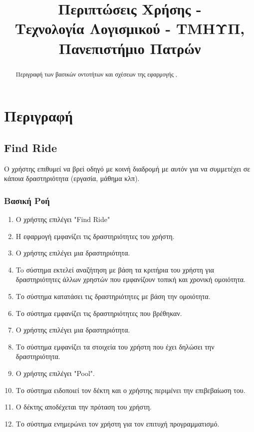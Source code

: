 

\fancyhead[R]{\leftmark}

\title{
    Περιπτώσεις Χρήσης - \appname\\[1ex]
    \large Τεχνολογία Λογισμικού - ΤΜΗΥΠ, Πανεπιστήμιο Πατρών \\[2ex]
}



\maketitle
\thispagestyle{empty}
\newpage

\tableofcontents
\newpage

\begin{abstract}
    Περιγραφή των βασικών οντοτήτων και σχέσεων της εφαρμογής \appname,
\end{abstract}

\newpage

\section{Περιγραφή}

\subsection{Find Ride}

Ο χρήστης επιθυμεί να βρεί οδηγό με κοινή διαδρομή με αυτόν για να συμμετέχει σε
κάποια δραστηριότητα (εργασία, μάθημα κλπ).

\subsubsection{Βασική Ροή}
\begin{enumerate}
    \item Ο χρήστης επιλέγει "Find Ride"
    \item Η εφαρμογή εμφανίζει τις δραστηριότητες του χρήστη.
    \item Ο χρήστης επιλέγει μια δραστηριότητα.
    \item To σύστημα εκτελεί αναζήτηση με βάση τα κριτήρια του χρήστη για δραστηριότητες
          άλλων χρηστών που εμφανίζουν τοπική και χρονική ομοιότητα.
    \item Το σύστημα κατατάσει τις δραστηριότητες με βάση την ομοιότητα.
    \item Το σύστημα εμφανίζει τις δραστηριότητες που βρέθηκαν.
    \item Ο χρήστης επιλέγει μια δραστηριότητα.
    \item Το σύστημα εμφανίζει τα στοιχεία του χρήστη που έχει δηλώσει την δραστηριότητα.
    \item Ο χρήστης επιλέγει "Pool".
    \item Το σύστημα ειδοποιεί τον δέκτη και ο χρήστης περιμένει την επιβεβαίωση του.
    \item O δέκτης αποδέχεται την πρόταση του χρήστη.
    \item Το σύστημα ενημερώνει τον χρήστη για τον επιτυχή προγραμματισμό.
\end{enumerate}

